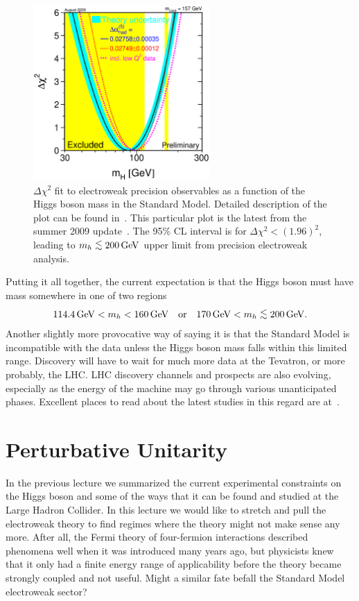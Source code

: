 \documentclass[12pt]{article}
\def\beq{\begin{eqnarray}}
\def\eeq{\end{eqnarray}}
\def\xsection#1{\section{#1}}
\def\gev{\, {\rm GeV}}
\newcommand{\lsim}{\lower.7ex\hbox{$\;\stackrel{\textstyle<}{\sim}\;$}}
\begin{document}
\begin{figure}[t]
\begin{center}
\includegraphics[width=0.6\textwidth]{s09_blueband}
\vspace{0.3cm}
\caption{$\Delta\chi^2$ fit to electroweak precision observables as a function of the Higgs boson mass in the Standard Model. Detailed description of the plot can be found in~\cite{Alcaraz:2006mx}. This particular plot is the latest from the summer 2009 update~\cite{LEPEWWG 2009}. The 95\% CL interval is for $\Delta\chi^2<(1.96)^2$, leading to $m_h\lsim 200\gev$ upper limit from precision electroweak analysis.
\label{fig:chi2}}
\end{center}
\end{figure}


Putting it all together, the current expectation is that the Higgs boson must have mass somewhere in one of two regions
\beq
114.4\gev < m_h<160\gev~~~{\rm or}~~~170\gev<m_h\lsim 200\gev.
\eeq
Another slightly more provocative way of saying it is that the Standard Model is incompatible with the data unless the Higgs boson mass falls within this limited range.
Discovery will have to wait for much more data at the Tevatron, or more probably, the LHC. LHC discovery channels and prospects are also evolving, especially as the energy of the machine may go through various unanticipated phases. Excellent places to read about the latest studies in this regard are at~\cite{Aad:2009wy,CMSTDR}.



\xsection{Perturbative Unitarity}

In the previous lecture we summarized the current experimental constraints on the Higgs boson and some of the ways that it can be found and studied at the Large Hadron Collider. In this lecture we would like to stretch and pull the electroweak theory to find regimes where the theory might not make sense any more. After all, the Fermi theory of four-fermion interactions described phenomena well when it was introduced many years ago, but physicists knew that it only had a finite energy range of applicability before the theory became strongly coupled and not useful. Might a similar fate befall the Standard Model electroweak sector?
\end{document}
